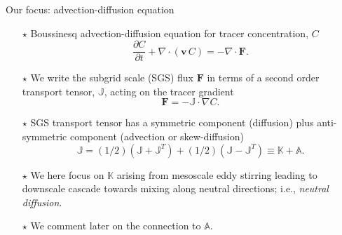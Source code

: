 \documentclass{beamer}
\begin{document}
\begin{frame}{Our focus: advection-diffusion equation}

\begin{itemize}

\item[$\star$] Boussinesq advection-diffusion equation for tracer concentration, $C$
\begin{equation}
    \frac{\partial C}{\partial t} + \nabla \cdot ( {\bm v} \, C)
    = -\nabla \cdot {\bm F}.
\end{equation}

\item[$\star$]  We write the subgrid scale (SGS) flux ${\bm F}$ in terms of a second order transport tensor, $\mathbb{J}$, acting on the tracer gradient 
\begin{equation}
  {\bm F}  = -\mathbb{J} \cdot \nabla C.
\end{equation}

\item[$\star$] SGS transport tensor has a symmetric component (diffusion) plus anti-symmetric component (advection or skew-diffusion)
\begin{equation}
    \mathbb{J} =  (1/2)(\mathbb{J} + \mathbb{J}^{T})
     + (1/2)(\mathbb{J} - \mathbb{J}^{T})
     \equiv \mathbb{K} + \mathbb{A}.
\end{equation}

\item[$\star$] We here focus on $\mathbb{K}$ arising from mesoscale eddy stirring leading to downscale cascade towards mixing along neutral directions; i.e., {\it neutral diffusion}. 

\item[$\star$]  We comment later on the connection to $\mathbb{A}$.
 
\end{itemize}

\end{frame}



\end{document}
